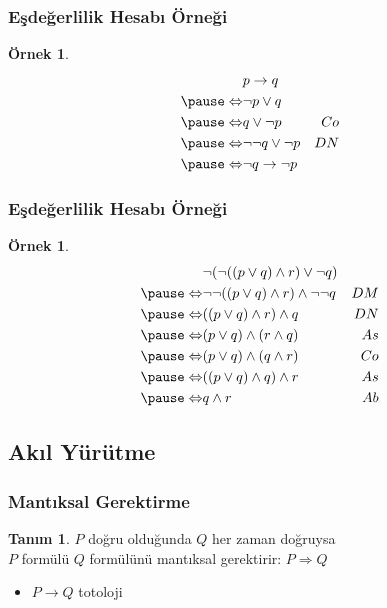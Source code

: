 \documentclass[dvipsnames]{beamer}
\theoremstyle{definition}
\newtheorem{tanim}[theorem]{Tanım}
\theoremstyle{example}
\newtheorem{ornek}[theorem]{Örnek}
\theoremstyle{plain}
\begin{document}
\begin{frame}
  \frametitle{Eşdeğerlilik Hesabı Örneği}

  \begin{ornek}
    \begin{eqnarray*}
                      & p \rightarrow q           &\\
      \pause
      \Leftrightarrow & \neg p \vee q             &\\
      \pause
      \Leftrightarrow & q \vee \neg p             & Co\\
      \pause
      \Leftrightarrow & \neg \neg q \vee \neg p   & DN\\
      \pause
      \Leftrightarrow & \neg q \rightarrow \neg p &
    \end{eqnarray*}
  \end{ornek}
\end{frame}

\begin{frame}
  \frametitle{Eşdeğerlilik Hesabı Örneği}

  \begin{ornek}
    \begin{eqnarray*}
                      & \neg (\neg ((p \vee q) \wedge r) \vee \neg q)      &\\
      \pause
      \Leftrightarrow & \neg \neg ((p \vee q) \wedge r) \wedge \neg \neg q & DM\\
      \pause
      \Leftrightarrow & ((p \vee q) \wedge r) \wedge q                     & DN\\
      \pause
      \Leftrightarrow & (p \vee q) \wedge (r \wedge q)                     & As\\
      \pause
      \Leftrightarrow & (p \vee q) \wedge (q \wedge r)                     & Co\\
      \pause
      \Leftrightarrow & ((p \vee q) \wedge q) \wedge r                     & As\\
      \pause
      \Leftrightarrow & q \wedge r                                         & Ab
    \end{eqnarray*}
  \end{ornek}
\end{frame}

\subsection{Akıl Yürütme}

\begin{frame}
  \frametitle{Mantıksal Gerektirme}

  \begin{tanim}
    $P$ doğru olduğunda $Q$ her zaman doğruysa\\
    $P$ formülü $Q$ formülünü \alert{mantıksal gerektirir}: $P \Rightarrow Q$
  \end{tanim}

  \begin{itemize}
    \item $P \rightarrow Q$ totoloji
  \end{itemize}
\end{frame}
\end{document}
